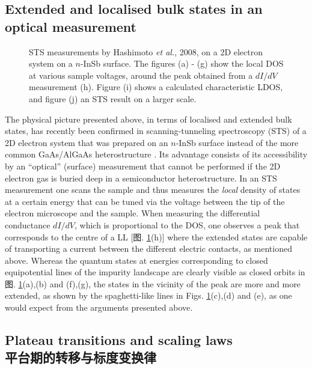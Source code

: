 \documentclass[10pt]{book}
\begin{document}
\subsection[光学测量中的延展/局域体态]{Extended and localised bulk states in an optical measurement}

\begin{figure}[h]
\begin{center}
\end{center}
\caption{ STS measurements by Hashimoto {\sl et al.}, 2008, on a 2D electron system on a $n$-InSb surface. The figures (a) - (g)
show the local DOS at various sample voltages, around the peak obtained from a $dI/dV$ measurement (h). Figure (i) shows a calculated
characteristic LDOS, and figure (j) an STS result on a larger scale. }
\label{fig15b}
\end{figure}

The physical picture presented above, in terms of localised and extended bulk states, has recently been confirmed in scanning-tunneling 
spectroscopy (STS) of a 2D electron system that was prepared on an $n$-InSb surface
instead of the more common GaAs/AlGaAs heterostructure \cite{hashimoto}. 
Its advantage consists of its accessibility by an ``optical'' (surface) measurement that cannot be performed if
the 2D electron gas is buried deep in a semiconductor heterostructure. In an STS measurement one scans the sample and thus
measures the {\sl local} density of states at a certain energy that can be tuned via the voltage between the tip of the electron 
microscope and the sample. When measuring the differential conductance $dI/dV$, which is proportional to the DOS,
one observes a peak that corresponds to the centre of a LL [图. \ref{fig15b}(h)]
where the extended states are capable of transporting a current between the different electric contacts, as mentioned above.
Whereas the quantum states at energies corresponding to closed equipotential lines of the impurity landscape are clearly visible 
as closed orbits in 图. \ref{fig15b}(a),(b) and (f),(g), the states in the vicinity of the peak are more and more extended, 
as shown by the spaghetti-like lines in Figs. \ref{fig15b}(c),(d) and (e), as one would expect from the arguments presented above.



\subsection[平台期的转移与标度变换律]{Plateau transitions and scaling laws\\\bf 平台期的转移与标度变换律}
\end{document}
